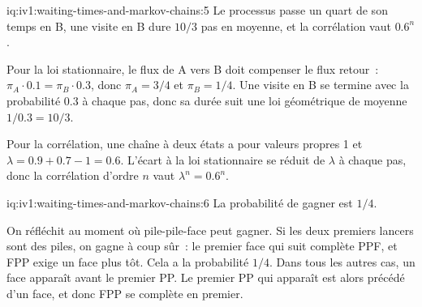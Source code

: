 \begin{solution}{iq:iv1:waiting-times-and-markov-chains:5}
Le processus passe un quart de son temps en B, une visite en B dure $10/3$ pas en moyenne, et la corrélation vaut $0.6^n$.

Pour la loi stationnaire, le flux de A vers B doit compenser le flux retour~: $\pi_A \cdot 0.1 = \pi_B \cdot 0.3$, donc $\pi_A = 3/4$ et $\pi_B = 1/4$. Une visite en B se termine avec la probabilité $0.3$ à chaque pas, donc sa durée suit une loi géométrique de moyenne $1/0.3 = 10/3$.

Pour la corrélation, une chaîne à deux états a pour valeurs propres 1 et $\lambda = 0.9 + 0.7 - 1 = 0.6$. L'écart à la loi stationnaire se réduit de $\lambda$ à chaque pas, donc la corrélation d'ordre $n$ vaut $\lambda^n = 0.6^n$.

\end{solution}

\begin{solution}{iq:iv1:waiting-times-and-markov-chains:6}
La probabilité de gagner est $1/4$.

On réfléchit au moment où pile-pile-face peut gagner. Si les deux premiers lancers sont des piles, on gagne à coup sûr~: le premier face qui suit complète PPF, et FPP exige un face plus tôt. Cela a la probabilité $1/4$. Dans tous les autres cas, un face apparaît avant le premier PP. Le premier PP qui apparaît est alors précédé d'un face, et donc FPP se complète en premier.

\end{solution}

